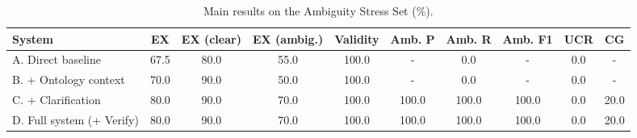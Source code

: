 \begin{table}[t]
\centering
\caption{Main results on the Ambiguity Stress Set (\%).}
\label{tab:main}
\small
\begin{tabular}{lccccccccc}
\hline
System & EX & EX (clear) & EX (ambig.) & Validity & Amb. P & Amb. R & Amb. F1 & UCR & CG \\
\hline
A. Direct baseline & 67.5 & 80.0 & 55.0 & 100.0 & - & 0.0 & - & 0.0 & - \\
B. + Ontology context & 70.0 & 90.0 & 50.0 & 100.0 & - & 0.0 & - & 0.0 & - \\
C. + Clarification & 80.0 & 90.0 & 70.0 & 100.0 & 100.0 & 100.0 & 100.0 & 0.0 & 20.0 \\
D. Full system (+ Verify) & 80.0 & 90.0 & 70.0 & 100.0 & 100.0 & 100.0 & 100.0 & 0.0 & 20.0 \\
\hline
\end{tabular}
\end{table}
